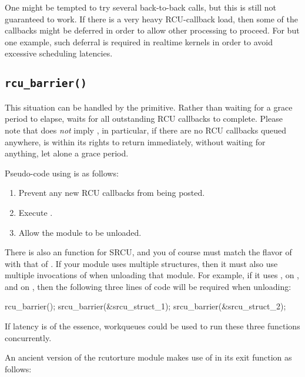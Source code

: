 One might be tempted to try several back-to-back 
calls, but this is still not guaranteed to work.
If there is a very
heavy RCU-callback load, then some of the callbacks might be deferred in
order to allow other processing to proceed.
For but one example, such
deferral is required in realtime kernels in order to avoid excessive
scheduling latencies.


\subsection{\texttt{rcu\_barrier()}}
\label{sec:rcu:rcu_barrier()}

This situation can be handled by the  primitive.
Rather
than waiting for a grace period to elapse,  waits for all
outstanding RCU callbacks to complete.
Please note that 
does \emph{not} imply , in particular, if there are no RCU
callbacks queued anywhere,  is within its rights to return
immediately, without waiting for anything, let alone a grace period.

Pseudo-code using  is as follows:

\begin{enumerate}
\item Prevent any new RCU callbacks from being posted.
\item Execute .
\item Allow the module to be unloaded.
\end{enumerate}

There is also an  function for SRCU, and you of course
must match the flavor of  with that of .
If your module uses multiple  structures, then it must also
use multiple invocations of  when unloading that module.
For example, if it uses ,  on , and
 on , then the following three lines of code
will be required when unloading:

\begin{VerbatimN}
	rcu_barrier();
	srcu_barrier(&srcu_struct_1);
	srcu_barrier(&srcu_struct_2);
\end{VerbatimN}

If latency is of the essence, workqueues could be used to run these
three functions concurrently.

An ancient version of the rcutorture module makes use of 
in its exit function as follows:

